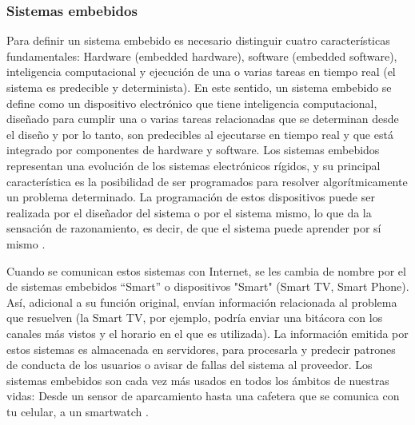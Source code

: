 
\subsubsection{ Sistemas embebidos }

Para definir un sistema embebido es necesario distinguir cuatro características fundamentales: Hardware (embedded hardware), software (embedded software), inteligencia computacional y ejecución de una o varias tareas en tiempo real (el sistema es predecible y determinista). En este sentido, un sistema embebido se define como un dispositivo electrónico que tiene inteligencia computacional, diseñado para cumplir una o varias tareas relacionadas que se determinan desde el diseño y por lo tanto, son predecibles al ejecutarse en tiempo real y que está integrado por componentes de hardware y software. Los sistemas embebidos representan una evolución de los sistemas electrónicos rígidos, y su principal característica es la posibilidad de ser programados para resolver algorítmicamente un problema determinado. La programación de estos dispositivos puede ser realizada por el diseñador del sistema o por el sistema mismo, lo que da la sensación de razonamiento, es decir, de que el sistema puede aprender por sí mismo \cite{IOESisEmb}.
\\ \par


Cuando se comunican estos sistemas con Internet, se les cambia de nombre por el de sistemas embebidos ``Smart'' o dispositivos "Smart" (Smart TV, Smart Phone). Así, adicional a su función original, envían información relacionada al problema que resuelven (la Smart TV, por ejemplo, podría enviar una bitácora con los canales más vistos y el horario en el que es utilizada). La información emitida por estos sistemas es almacenada en servidores, para procesarla y predecir patrones de conducta de los usuarios o avisar de fallas del sistema al proveedor. Los sistemas embebidos son cada vez más usados en todos los ámbitos de nuestras vidas: Desde un sensor de aparcamiento hasta una cafetera que se comunica con tu celular, a un smartwatch \cite{IOESisEmb}.
\\ \par